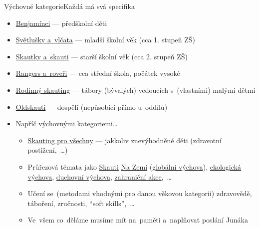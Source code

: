 \documentclass[compress, ucs, xelatex, 11pt, xcolor=dvipsnames, print,
	hyperref={
		bookmarks=true,
		unicode=true,
		colorlinks=true,
		pdftitle={Skautska vychovna metoda},
		plainpages=false,
		pdfauthor={Vojtech Zeisek},
		pdfsubject={Skautska vychovna metoda a jeji vyvoj za posledni stoleti a desetileti},
		pdfcreator={XeLaTeX},
		pdfkeywords={Junak, Pedagogika, Skaut, Skauting, Vychovna metoda},
		linkcolor=Black,
		anchorcolor=Black,
		citecolor=OliveGreen,
		filecolor=OliveGreen,
		menucolor=Black,
		urlcolor=OliveGreen,
		pdftex},
	url={hyphens, lowtilde} %
	]{beamer}
\begin{document}
\begin{frame}{Výchovné kategorie}{Každá má svá specifika}
	\begin{itemize}
		\item \href{https://krizovatka.skaut.cz/oddil/program/benjaminci}{Benjamínci} --- předškolní děti
		\item \href{https://krizovatka.skaut.cz/oddil/program/svetlusky-a-vlcata}{Světlušky a~vlčata} --- mladší školní věk (cca 1. stupeň ZŠ)
		\item \href{https://krizovatka.skaut.cz/oddil/program/skautky-a-skauti}{Skautky a~skauti} --- starší školní věk (cca 2. stupeň ZŠ)
		\item \href{https://krizovatka.skaut.cz/oddil/program/rangers-a-roveri}{Rangers a~roveři} --- cca střední škola, počátek vysoké
		\item \href{https://krizovatka.skaut.cz/oddil/program/rodinny-skauting}{Rodinný skauting} --- tábory (bývalých) vedoucích s~(vlastními) malými dětmi
		\item \href{https://krizovatka.skaut.cz/oddil/program/dospeli}{Oldskauti} --- dospělí (nepůsobící přímo u~oddílů)
		\item Napříč výchovnými kategoriemi\ldots
		\begin{itemize}
			\item \href{https://krizovatka.skaut.cz/organizace/ustredi/odbory/odbory-spv}{Skauting pro všechny} --- jakkoliv znevýhodněné děti (zdravotní postižení,~\ldots)
			\item Průřezová témata jako \href{https://krizovatka.skaut.cz/organizace/ustredi/odbory/skauti-na-zemi}{Skauti} \href{https://www.skautinazemi.cz/}{Na Zemi} (\href{https://www.nazemi.cz/cs/skauti}{globální výchova}), \href{https://krizovatka.skaut.cz/organizace/ustredi/odbory/ekoodbor/}{ekologická výchova}, \href{https://krizovatka.skaut.cz/organizace/ustredi/odbory/odbory-duchovni-vychovy}{duchovní výchova}, \href{https://krizovatka.skaut.cz/organizace/ustredi/odbory/odbory-zahranicni}{zahraniční akce},~\ldots
			\item Učení se~(metodami vhodnými pro danou věkovou kategorii) zdravovědě, táboření, zručnosti, \enquote{soft skills},~\ldots
			\item Ve~všem co~děláme musíme mít na~paměti a~naplňovat poslání Junáka
		\end{itemize}
	\end{itemize}
\end{frame}
\end{document}
